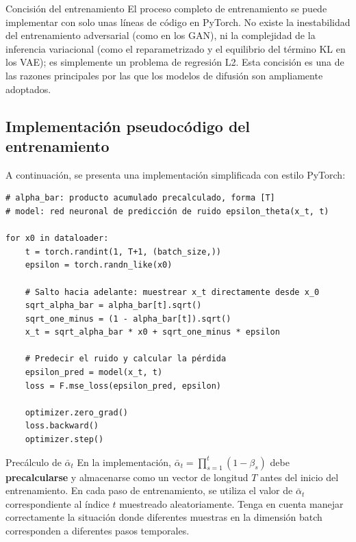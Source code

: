 \documentclass[a4paper]{article}
\begin{document}
\begin{knowledgebox}{Concisión del entrenamiento}
El proceso completo de entrenamiento se puede implementar con solo unas líneas de código en PyTorch. No existe la inestabilidad del entrenamiento adversarial (como en los GAN), ni la complejidad de la inferencia variacional (como el reparametrizado y el equilibrio del término KL en los VAE); es simplemente un problema de regresión L2. Esta concisión es una de las razones principales por las que los modelos de difusión son ampliamente adoptados.
\end{knowledgebox}

\subsection{Implementación pseudocódigo del entrenamiento}

A continuación, se presenta una implementación simplificada con estilo PyTorch:

\begin{lstlisting}[caption={Bucle central del entrenamiento de DDPM}, label=lst:train]
# alpha_bar: producto acumulado precalculado, forma [T]
# model: red neuronal de predicción de ruido epsilon_theta(x_t, t)

for x0 in dataloader:
    t = torch.randint(1, T+1, (batch_size,))
    epsilon = torch.randn_like(x0)

    # Salto hacia adelante: muestrear x_t directamente desde x_0
    sqrt_alpha_bar = alpha_bar[t].sqrt()
    sqrt_one_minus = (1 - alpha_bar[t]).sqrt()
    x_t = sqrt_alpha_bar * x0 + sqrt_one_minus * epsilon

    # Predecir el ruido y calcular la pérdida
    epsilon_pred = model(x_t, t)
    loss = F.mse_loss(epsilon_pred, epsilon)

    optimizer.zero_grad()
    loss.backward()
    optimizer.step()
\end{lstlisting}

\begin{warningbox}{Precálculo de $\bar{\alpha}_t$}
En la implementación, $\bar{\alpha}_t = \prod_{s=1}^{t}(1-\beta_s)$ debe \textbf{precalcularse} y almacenarse como un vector de longitud $T$ antes del inicio del entrenamiento. En cada paso de entrenamiento, se utiliza el valor de $\bar{\alpha}_t$ correspondiente al índice $t$ muestreado aleatoriamente. Tenga en cuenta manejar correctamente la situación donde diferentes muestras en la dimensión batch corresponden a diferentes pasos temporales.
\end{warningbox}
\end{document}
